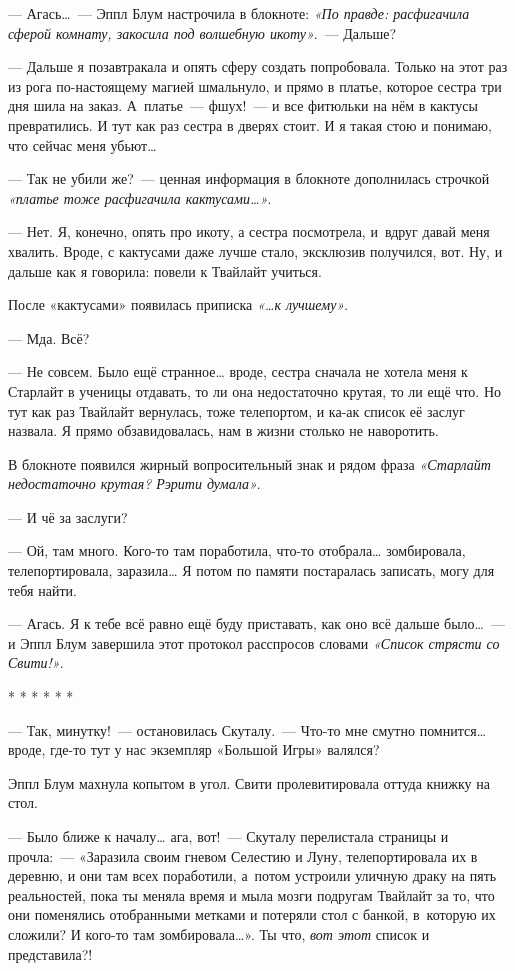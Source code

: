 \documentclass[fontsize=11pt,a5paper,titlepage=firstcover]{scrbook}
\begin{document}
--- Агась{\ldots}~--- Эппл Блум настрочила в блокноте: \emph{«По правде: расфигачила сферой комнату, закосила под волшебную икоту»}.~--- Дальше?

--- Дальше я позавтракала и опять сферу создать попробовала. Только на этот раз из рога по-настоящему магией шмальнуло, и прямо в платье, которое сестра три дня шила на заказ. А~платье~--- фшух!~--- и все фитюльки на нём в кактусы превратились. И тут как раз сестра в дверях стоит. И я такая стою и понимаю, что сейчас меня убьют{\ldots}

--- Так не убили же?~--- ценная информация в блокноте дополнилась строчкой \emph{«платье тоже расфигачила кактусами{\ldots}»}.

--- Нет. Я, конечно, опять про икоту, а сестра посмотрела, и~вдруг давай меня хвалить. Вроде, с кактусами даже лучше стало, эксклюзив получился, вот. Ну, и дальше как я говорила: повели к Твайлайт учиться.

После «кактусами» появилась приписка \emph{«{\ldots}к лучшему»}.

--- Мда. Всё?

--- Не совсем. Было ещё странное{\ldots} вроде, сестра сначала не хотела меня к Старлайт в ученицы отдавать, то ли она недостаточно крутая, то ли ещё что. Но тут как раз Твайлайт вернулась, тоже телепортом, и ка-ак список её заслуг назвала. Я прямо обзавидовалась, нам в жизни столько не наворотить.

В блокноте появился жирный вопросительный знак и рядом фраза \emph{«Старлайт недостаточно крутая? Рэрити думала»}.

--- И чё за заслуги?

--- Ой, там много. Кого-то там поработила, что-то отобрала{\ldots} зомбировала, телепортировала, заразила{\ldots} Я потом по памяти постаралась записать, могу для тебя найти.

--- Агась. Я к тебе всё равно ещё буду приставать, как оно всё дальше было{\ldots}~--- и Эппл Блум завершила этот протокол расспросов словами \emph{«Список стрясти со Свити!»}.
\begin{center}* * * * * *\end{center}


--- Так, минутку!~--- остановилась Скуталу.~--- Что-то мне смутно помнится{\ldots} вроде, где-то тут у нас экземпляр «Большой Игры» валялся?

Эппл Блум махнула копытом в угол. Свити пролевитировала оттуда книжку на стол.

--- Было ближе к началу{\ldots} ага, вот!~--- Скуталу перелистала страницы и прочла:~--- «Заразила своим гневом Селестию и Луну, телепортировала их в деревню, и они там всех поработили, а~потом устроили уличную драку на пять реальностей, пока ты меняла время и мыла мозги подругам Твайлайт за то, что они поменялись отобранными метками и потеряли стол с банкой, в~которую их сложили? И кого-то там зомбировала{\ldots}». Ты что, \emph{вот этот} список и представила?!
\end{document}
